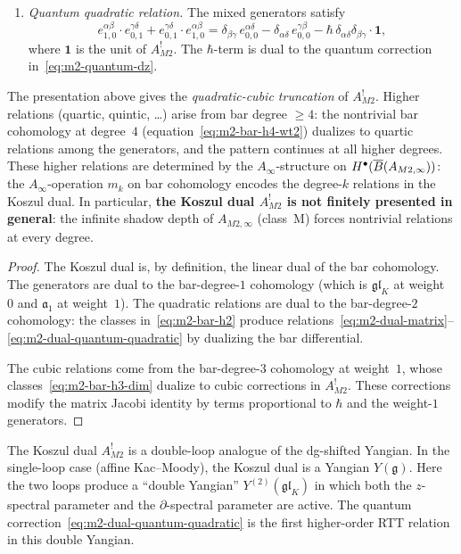 \begin{theorem}
\begin{enumerate}[label=(\roman*),leftmargin=1.8em]
\item \emph{Quantum quadratic relation.}
The mixed generators satisfy
\begin{equation}%
e^{\alpha\beta}_{1,0}\cdot e^{\gamma\delta}_{0,1}
+ e^{\gamma\delta}_{0,1}\cdot e^{\alpha\beta}_{1,0}
= \delta_{\beta\gamma}\,e^{\alpha\delta}_{0,0}
- \delta_{\alpha\delta}\,e^{\gamma\beta}_{0,0}
- \hbar\,\delta_{\alpha\delta}\delta_{\beta\gamma}\cdot\mathbf{1},
\end{equation}
where $\mathbf{1}$ is the unit of $A^!_{M2}$. The
$\hbar$-term is dual to the quantum correction
in~\eqref{eq:m2-quantum-dz}.
\end{enumerate}
The presentation above gives the \emph{quadratic-cubic truncation}
of $A^!_{M2}$. Higher relations (quartic, quintic, \ldots) arise
from bar degree $\ge 4$: the nontrivial bar cohomology at degree~$4$
(equation~\eqref{eq:m2-bar-h4-wt2}) dualizes to quartic relations
among the generators, and the pattern continues at all higher
degrees. These higher relations are determined by the
$A_\infty$-structure on $H^\bullet(\overline{B}(A_{M2,\infty}))$: the
$A_\infty$-operation $m_k$ on bar cohomology encodes the degree-$k$
relations in the Koszul dual. In particular,
\textbf{the Koszul dual $A^!_{M2}$ is not finitely presented
in general}: the infinite shadow depth of $A_{M2,\infty}$
(class~M) forces nontrivial relations at every degree.
\end{theorem}

\begin{proof}
The Koszul dual is, by definition, the linear dual of the bar
cohomology. The generators are dual to the bar-degree-$1$
cohomology (which is $\mathfrak{gl}_K$ at weight~$0$ and
$\mathfrak{a}_1$ at weight~$1$). The quadratic relations are dual
to the bar-degree-$2$ cohomology:
the classes in~\eqref{eq:m2-bar-h2} produce
relations~\eqref{eq:m2-dual-matrix}--\eqref{eq:m2-dual-quantum-quadratic}
by dualizing the bar differential.

The cubic relations come from the bar-degree-$3$ cohomology
at weight~$1$, whose classes~\eqref{eq:m2-bar-h3-dim} dualize
to cubic corrections in $A^!_{M2}$. These corrections modify
the matrix Jacobi identity by terms proportional to $\hbar$
and the weight-$1$ generators.
\end{proof}

\begin{remark}
The Koszul dual $A^!_{M2}$ is a double-loop analogue of
the dg-shifted Yangian. In the single-loop case (affine
Kac--Moody), the Koszul dual is a Yangian $Y(\mathfrak{g})$.
Here the two loops produce a ``double Yangian''
$Y^{(2)}(\mathfrak{gl}_K)$ in which both the $z$-spectral
parameter and the $\partial$-spectral parameter are active.
The quantum correction~\eqref{eq:m2-dual-quantum-quadratic}
is the first higher-order RTT relation in this double Yangian.
\end{remark}


